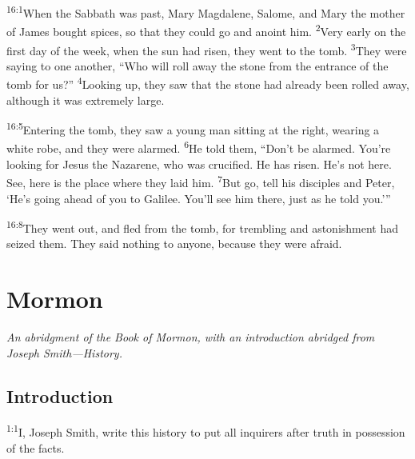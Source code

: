 \documentclass[openany,12pt,english]{book}
\newenvironment{para}{\par\pretolerance=100\tolerance=200\setlength{\emergencystretch}{0.6em}\relax}{\par}
\begin{document}
\bigskip{}

\begin{para}
    \textsuperscript{16:1}\thinspace{}When the Sabbath was past, Mar\-y Mag\-da\-lene, Salome, and Mar\-y the moth\-er of James bought spices, so that they could go and a\-noint him.
    \textsuperscript{2}\thinspace{}Ver\-y ear\-ly on the first day of the week, when the sun had ris\-en, they went to the tomb.
    \textsuperscript{3}\thinspace{}They were say\-ing to one an\-oth\-er, “Who will roll a\-way the stone from the en\-trance of the tomb for us?”
    \textsuperscript{4}\thinspace{}Looking up, they saw that the stone had al\-read\-y been rolled a\-way, al\-though it was ex\-treme\-ly large.
\end{para}

\begin{para}
    \textsuperscript{16:5}\thinspace{}Entering the tomb, they saw a young man sit\-ting at the right, wear\-ing a white robe, and they were alarmed.
    \textsuperscript{6}\thinspace{}He told them, “Don't be alarmed. You're looking for Jesus the Nazarene, who was cru\-ci\-fied. He has ris\-en. He's not here. See, here is the place where they laid him.
    \textsuperscript{7}\thinspace{}But go, tell his disciples and Pe\-ter, ‘He's go\-ing a\-head of you to Gal\-i\-lee. You'll see him there, just as he told you.’”
\end{para}

\begin{para}
    \textsuperscript{16:8}\thinspace{}They went out, and fled from the tomb, for trem\-bling and as\-ton\-ish\-ment had seized them. They said noth\-ing to any\-one, be\-cause they were a\-fraid.
\end{para}

\chapter*{Mormon}
\begin{changemargin}{.6in}{.6in}
  \begin{center}
    \itshape
    An a\-bridg\-ment of the Book of Mormon, with an in\-tro\-duc\-tion a\-bridged from Jo\-seph Smith---His\-to\-ry.
  \end{center}
\end{changemargin}
\section*{Introduction}
\begin{para}
    \textsuperscript{1:1}\thinspace{}I, Jo\-seph Smith, write this his\-to\-ry to put all inquirers af\-ter truth in pos\-ses\-sion of the facts.
\end{para}
\end{document}
